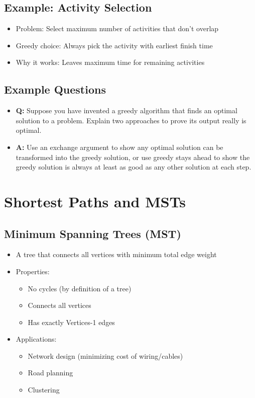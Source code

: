 \documentclass[11pt,a4paper]{article}
\begin{document}
\begin{multicols}{2}
\subsection{Example: Activity Selection}
\begin{itemize}
    \item Problem: Select maximum number of activities that don't overlap
    \item Greedy choice: Always pick the activity with earliest finish time
    \item Why it works: Leaves maximum time for remaining activities
\end{itemize}

\subsection{Example Questions}
\begin{itemize}
    \item \textbf{Q:} Suppose you have invented a greedy algorithm that finds an optimal solution to a problem. Explain two approaches to prove its output really is optimal.
    \item \textbf{A:} Use an exchange argument to show any optimal solution can be transformed into the greedy solution, or use greedy stays ahead to show the greedy solution is always at least as good as any other solution at each step.
\end{itemize}

\section{Shortest Paths and MSTs}
\subsection{Minimum Spanning Trees (MST)}
\begin{itemize}
    \item A tree that connects all vertices with minimum total edge weight
    \item Properties:
    \begin{itemize}
        \item No cycles (by definition of a tree)
        \item Connects all vertices
        \item Has exactly Vertices-1 edges
    \end{itemize}
    \item Applications:
    \begin{itemize}
        \item Network design (minimizing cost of wiring/cables)
        \item Road planning
        \item Clustering
    \end{itemize}
\end{itemize}


\end{multicols}
\end{document}
